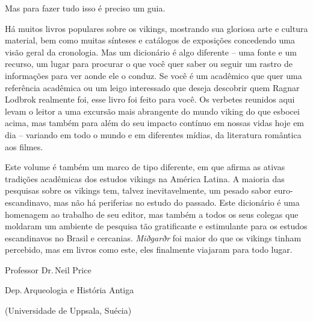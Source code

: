 Mas para fazer tudo isso é preciso um guia.

Há muitos livros populares sobre os vikings, mostrando sua gloriosa arte
e cultura material, bem como muitas sínteses e catálogos de exposições
concedendo uma visão geral da cronologia. Mas um dicionário é algo
diferente -- uma fonte e um recurso, um lugar para procurar o que você
quer saber ou seguir um rastro de informações para ver aonde ele o conduz.
Se você é um acadêmico que quer uma referência acadêmica ou um leigo
interessado que deseja descobrir quem Ragnar Lodbrok realmente foi, esse
livro foi feito para você. Os verbetes reunidos aqui levam o leitor a
uma excursão mais abrangente do mundo viking do que esbocei acima, mas
também para além do seu impacto contínuo em nossas vidas hoje em dia --
variando em todo o mundo e em diferentes mídias, da literatura romântica
aos filmes.

Este volume é também um marco de tipo diferente, em que afirma as ativas
tradições acadêmicas dos estudos vikings na América Latina. A maioria das pesquisas sobre os vikings tem, talvez inevitavelmente, um pesado sabor euro-escandinavo, mas não há periferias no estudo do passado. Este
dicionário é uma homenagem ao trabalho de seu editor, mas também a todos os seus colegas que moldaram um ambiente de pesquisa tão gratificante e estimulante para os
estudos escandinavos no Brasil e cercanias. \emph{Miðgarðr} foi maior do
que os vikings tinham percebido, mas em livros como este, eles
finalmente viajaram para todo lugar.\medskip

\EP[2]
\hfill Professor Dr.\,Neil Price

\hfill Dep.\,Arqueologia e História Antiga 

\hfill (Universidade de Uppsala, Suécia)
